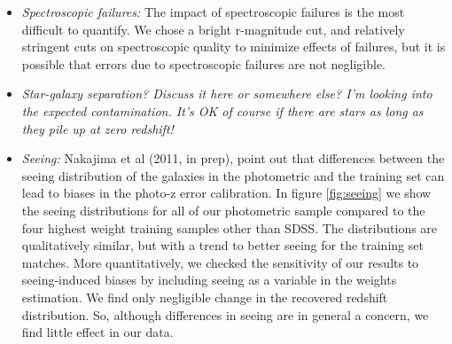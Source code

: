 \documentclass[preprint]{aastex}
\begin{document}
\begin{itemize}
\item {\it Spectroscopic failures: } The impact of spectroscopic failures is the
most difficult to quantify.  We chose a bright r-magnitude cut, and relatively
stringent cuts on spectroscopic quality to minimize effects of failures, but it
is possible that errors due to spectroscopic failures are not negligible.

\item {\it Star-galaxy separation? Discuss it here or somewhere else? {\color{red} I'm
looking into the expected contamination.  It's OK of course if there are stars as long as they
pile up at zero redshift!}}

\item {\it Seeing: } Nakajima et al (2011, in prep), point out that differences
between the seeing distribution of the galaxies in the photometric and the
training set can lead to biases in the photo-z error calibration.  In figure
\ref{fig:seeing} we show the seeing distributions for all of our photometric
sample compared to the four highest weight training samples other than SDSS.
The distributions are qualitatively similar, but with a trend to better seeing
for the training set matches.  More quantitatively, we checked the sensitivity
of our results to seeing-induced biases by including seeing as a variable in
the weights estimation.  We find only negligible change in the recovered
redshift distribution.  So, although differences in seeing are in general a
concern, we find little effect in our data.

\end{itemize}
\end{document}
